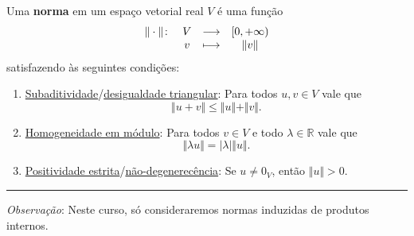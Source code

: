 \begin{definition}
	Uma \textbf{norma} em um espaço vetorial real \(V\) é uma função
	\[\begin{array}{r c c c}
		\Vert\cdot\Vert\colon
			&V
				&\longrightarrow
					&[0,+\infty)\\
			&v
				&\longmapsto
					&\Vert v\Vert
		\end{array}\]
	satisfazendo às seguintes condições:
	
	\begin{enumerate}
		\item \uline{Subaditividade}/\uline{desigualdade triangular}: Para todos $u,v\in V$ vale que
			\[\Vert u+v\Vert\leq\Vert u\Vert+\Vert v\Vert.\]
		\item \uline{Homogeneidade em módulo}: Para todos $v\in V$ e todo $\lambda\in\mathbb{R}$ vale que
			\[\Vert\lambda u\Vert=|\lambda|\Vert u\Vert.\]
		\item \uline{Positividade estrita}/\uline{não-degenerecência}: Se $u\neq 0_V$, então $\Vert u\Vert>0$.
	\end{enumerate}
	
	\hrule
	
	\textit{Observação}: Neste curso, só consideraremos normas induzidas de produtos internos.
\end{definition}
